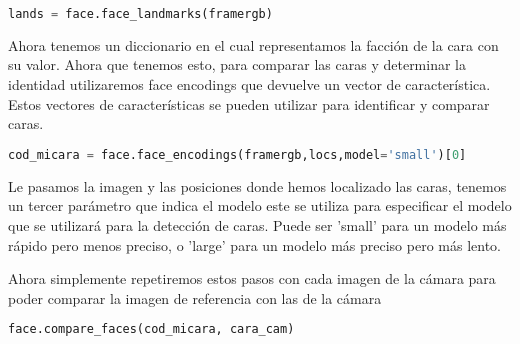 \begin{lstlisting}[language=Python]
  lands = face.face_landmarks(framergb)
\end{lstlisting}

Ahora tenemos un diccionario en el cual representamos la facción de la cara con su valor.
Ahora que tenemos esto, para comparar las caras y determinar la identidad utilizaremos 
face encodings que devuelve un vector de característica.
Estos vectores de características se pueden utilizar para identificar y comparar caras.

\begin{lstlisting}[language=Python]
  cod_micara = face.face_encodings(framergb,locs,model='small')[0]
\end{lstlisting}

Le pasamos la imagen y las posiciones donde hemos localizado las caras, tenemos un tercer parámetro
que indica el modelo este se utiliza para especificar el modelo que se utilizará para la detección de caras.
Puede ser 'small' para un modelo más rápido pero menos preciso, o 'large' para un modelo más preciso pero más lento.

Ahora simplemente repetiremos estos pasos con cada imagen de la cámara para poder comparar la imagen de referencia
con las de la cámara

\begin{lstlisting}[language=Python]
  face.compare_faces(cod_micara, cara_cam)
\end{lstlisting}



